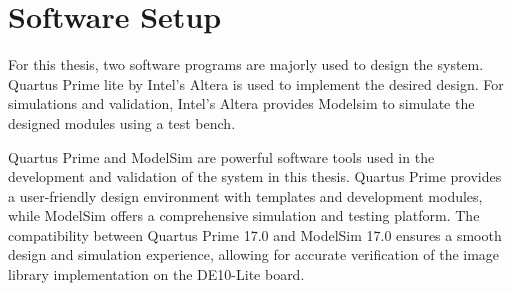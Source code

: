 \section{Software Setup}
\par For this thesis, two software programs are majorly used to design the system. Quartus Prime lite by Intel's Altera is used to implement the desired design. For simulations and validation, Intel's Altera provides Modelsim to simulate the designed modules using a test bench. \newline
\par Quartus Prime and ModelSim are powerful software tools used in the development and validation of the system in this thesis. Quartus Prime provides a user-friendly design environment with templates and development modules, while ModelSim offers a comprehensive simulation and testing platform. The compatibility between Quartus Prime 17.0 and ModelSim 17.0 ensures a smooth design and simulation experience, allowing for accurate verification of the image library implementation on the DE10-Lite board. \newline
